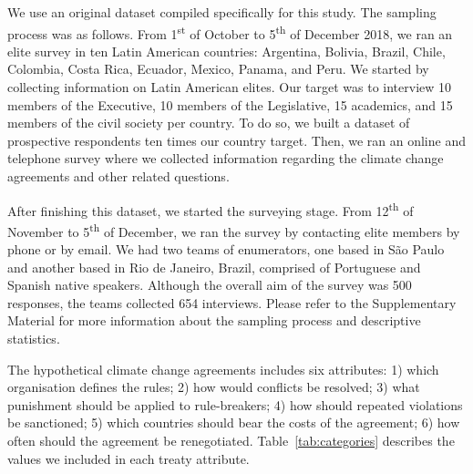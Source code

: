 \documentclass[a4paper,12pt]{article}
\begin{document}
We use an original dataset compiled specifically for this study. The sampling process was as follows. From 1\textsuperscript{st} of October to 5\textsuperscript{th} of December 2018, we ran an elite survey in ten Latin American countries: Argentina, Bolivia, Brazil, Chile, Colombia, Costa Rica, Ecuador, Mexico, Panama, and Peru. We started by collecting information on Latin American elites. Our target was to interview 10 members of the Executive, 10 members of the Legislative, 15 academics, and 15 members of the civil society per country. To do so, we built a dataset of prospective respondents ten times our country target. Then, we ran an online and telephone survey where we collected information regarding the climate change agreements and other related questions.

After finishing this dataset, we started the surveying stage. From 12\textsuperscript{th} of November to 5\textsuperscript{th} of December, we ran the survey by contacting elite members by phone or by email. We had two teams of enumerators, one based in S\~{a}o Paulo and another based in Rio de Janeiro, Brazil, comprised of Portuguese and Spanish native speakers. Although the overall aim of the survey was 500 responses, the teams collected 654 interviews. Please refer to the Supplementary Material for more information about the sampling process and descriptive statistics.

The hypothetical climate change agreements includes six attributes: 1) which organisation defines the rules; 2) how would conflicts be resolved; 3) what punishment should be applied to rule-breakers; 4) how should repeated violations be sanctioned; 5) which countries should bear the costs of the agreement; 6) how often should the agreement be renegotiated. Table~\ref{tab:categories} describes the values we included in each treaty attribute. \\

\newpage 
\end{document}
